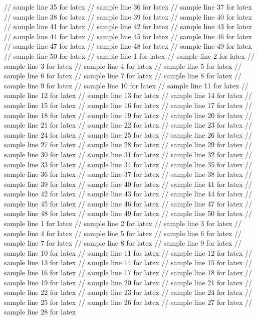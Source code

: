 // sample line 35 for latex
// sample line 36 for latex
// sample line 37 for latex
// sample line 38 for latex
// sample line 39 for latex
// sample line 40 for latex
// sample line 41 for latex
// sample line 42 for latex
// sample line 43 for latex
// sample line 44 for latex
// sample line 45 for latex
// sample line 46 for latex
// sample line 47 for latex
// sample line 48 for latex
// sample line 49 for latex
// sample line 50 for latex
// sample line 1 for latex
// sample line 2 for latex
// sample line 3 for latex
// sample line 4 for latex
// sample line 5 for latex
// sample line 6 for latex
// sample line 7 for latex
// sample line 8 for latex
// sample line 9 for latex
// sample line 10 for latex
// sample line 11 for latex
// sample line 12 for latex
// sample line 13 for latex
// sample line 14 for latex
// sample line 15 for latex
// sample line 16 for latex
// sample line 17 for latex
// sample line 18 for latex
// sample line 19 for latex
// sample line 20 for latex
// sample line 21 for latex
// sample line 22 for latex
// sample line 23 for latex
// sample line 24 for latex
// sample line 25 for latex
// sample line 26 for latex
// sample line 27 for latex
// sample line 28 for latex
// sample line 29 for latex
// sample line 30 for latex
// sample line 31 for latex
// sample line 32 for latex
// sample line 33 for latex
// sample line 34 for latex
// sample line 35 for latex
// sample line 36 for latex
// sample line 37 for latex
// sample line 38 for latex
// sample line 39 for latex
// sample line 40 for latex
// sample line 41 for latex
// sample line 42 for latex
// sample line 43 for latex
// sample line 44 for latex
// sample line 45 for latex
// sample line 46 for latex
// sample line 47 for latex
// sample line 48 for latex
// sample line 49 for latex
// sample line 50 for latex
// sample line 1 for latex
// sample line 2 for latex
// sample line 3 for latex
// sample line 4 for latex
// sample line 5 for latex
// sample line 6 for latex
// sample line 7 for latex
// sample line 8 for latex
// sample line 9 for latex
// sample line 10 for latex
// sample line 11 for latex
// sample line 12 for latex
// sample line 13 for latex
// sample line 14 for latex
// sample line 15 for latex
// sample line 16 for latex
// sample line 17 for latex
// sample line 18 for latex
// sample line 19 for latex
// sample line 20 for latex
// sample line 21 for latex
// sample line 22 for latex
// sample line 23 for latex
// sample line 24 for latex
// sample line 25 for latex
// sample line 26 for latex
// sample line 27 for latex
// sample line 28 for latex
